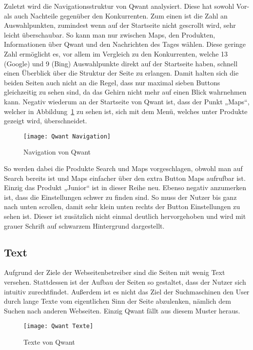 Zuletzt wird die Navigationsstruktur von Qwant analysiert.
Diese hat sowohl Vor- als auch Nachteile gegenüber den Konkurrenten.
Zum einen ist die Zahl an Auswahlpunkten, zumindest wenn auf der Startseite nicht gescrollt wird, sehr leicht überschaubar.
So kann man nur zwischen Maps, den Produkten, Informationen über Qwant und den Nachrichten des Tages wählen.
Diese geringe Zahl ermöglicht es, vor allem im Vergleich zu den Konkurrenten,
welche 13 (Google) und 9 (Bing) Auswahlpunkte direkt auf der
Startseite haben, schnell einen Überblick über die Struktur der Seite zu erlangen.
Damit halten sich die beiden Seiten auch nicht an die Regel,
dass nur maximal sieben Buttons gleichzeitig zu sehen sind, da das Gehirn nicht mehr auf einen Blick
wahrnehmen kann.\autocite[Seite 16]{Maulhardt6}
Negativ wiederum an der Startseite von Qwant ist, dass der Punkt „Maps“, welcher
in Abbildung~\ref{fig:qwantnavigation} zu sehen ist, sich mit dem Menü, welches unter Produkte gezeigt wird, überschneidet.
\begin{figure}[ht]
    \centering
    \texttt{[image: Qwant Navigation]}
    \caption{Navigation von Qwant}
    \label{fig:qwantnavigation}
\end{figure}

So werden dabei die
Produkte Search und Maps vorgeschlagen, obwohl man auf Search bereits ist und Maps einfacher über den extra Button Maps aufrufbar ist.
Einzig das Produkt „Junior“ ist in dieser Reihe neu.
Ebenso negativ anzumerken ist, dass die Einstellungen schwer zu finden sind.
So muss der Nutzer bis ganz nach unten scrollen, damit sehr klein unten rechts der Button Einstellungen zu sehen ist.
Dieser ist zusätzlich nicht einmal deutlich hervorgehoben und wird mit grauer Schrift auf schwarzem Hintergrund dargestellt.

\subsection{Text}\label{subsec:text}
Aufgrund der Ziele der Webseitenbetreiber sind die Seiten mit wenig Text versehen.
Stattdessen ist der Aufbau der Seiten so gestaltet, dass der Nutzer sich intuitiv zurechtfindet.
Außerdem ist es nicht das Ziel der Suchmaschinen den User durch lange Texte vom eigentlichen Sinn der Seite abzulenken,
nämlich dem Suchen nach anderen Webseiten.
Einzig Qwant fällt aus diesem Muster heraus.
\begin{figure}[ht]
    \centering
    \texttt{[image: Qwant Texte]}
    \caption{Texte von Qwant}\label{fig:figure9}
\end{figure}

